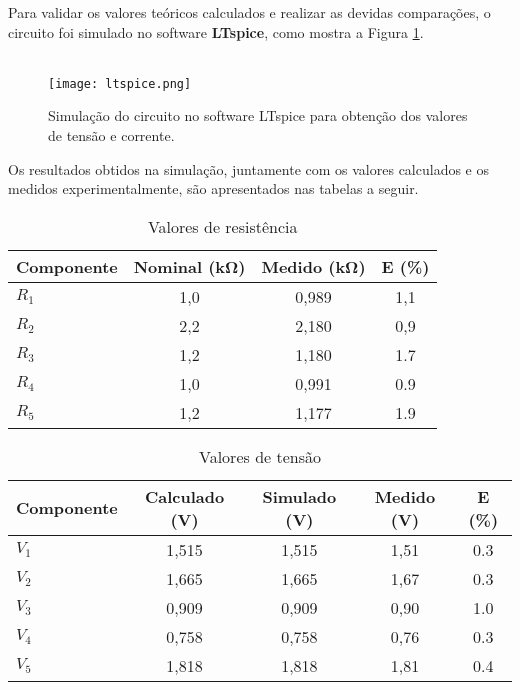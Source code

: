 \documentclass[a4paper, 12pt]{article}
\begin{document}
Para validar os valores teóricos calculados e realizar as devidas comparações, o circuito foi simulado no software \textbf{LTspice}, como mostra a Figura \ref{fig:simulacao_ltspice}. \\ \\

\begin{figure}[h!]
\centering
\texttt{[image: ltspice.png]}
\caption{Simulação do circuito no software LTspice para obtenção dos valores de tensão e corrente.}
\label{fig:simulacao_ltspice}
\end{figure}

Os resultados obtidos na simulação, juntamente com os valores calculados e os medidos experimentalmente, são apresentados nas tabelas a seguir.

\begin{table}[H]
\centering
\caption{Valores de resistência}
\label{tab:resistencias}
\begin{tabular}{|l|c|c|c|}
\hline
\textbf{Componente} & \textbf{Nominal (\si{\kilo\ohm})} & \textbf{Medido (\si{\kilo\ohm})} & \textbf{E (\%)} \\
\hline
$R_1$ & 1,0 & 0,989 & 1,1 \\ \hline
$R_2$ & 2,2 & 2,180 & 0,9 \\ \hline
$R_3$ & 1,2 & 1,180 & 1.7 \\ \hline
$R_4$ & 1,0 & 0,991 & 0.9 \\ \hline
$R_5$ & 1,2 & 1,177 & 1.9 \\ \hline
\end{tabular}
\end{table}



\begin{table}[H]
\centering
\caption{Valores de tensão}
\label{tab:tensoes}
\begin{tabular}{|l|c|c|c|c|}
\hline
\textbf{Componente} & \textbf{Calculado (V)} & \textbf{Simulado (V)} & \textbf{Medido (V)} & \textbf{E (\%)} \\
\hline
$V_1$ & 1,515 & 1,515 & 1,51 & 0.3 \\ \hline
$V_2$ & 1,665 & 1,665 & 1,67 & 0.3 \\ \hline
$V_3$ & 0,909 & 0,909 & 0,90 & 1.0 \\ \hline
$V_4$ & 0,758 & 0,758 & 0,76 & 0.3 \\ \hline
$V_5$ & 1,818 & 1,818 & 1,81 & 0.4 \\ \hline
\end{tabular}
\end{table}
\end{document}
